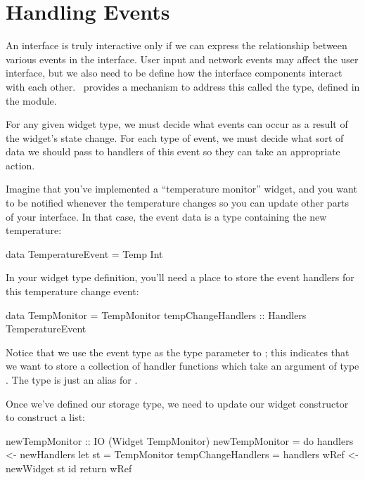 \section{Handling Events}
\label{sec:event_handlers}

An interface is truly interactive only if we can express the
relationship between various events in the interface.  User input and
network events may affect the user interface, but we also need to be
define how the interface components interact with each other.
\vtyui\ provides a mechanism to address this called the 
type, defined in the  module.

For any given widget type, we must decide what events can occur as a
result of the widget's state change.  For each type of event, we must
decide what sort of data we should pass to handlers of this event so
they can take an appropriate action.

Imagine that you've implemented a ``temperature monitor'' widget, and
you want to be notified whenever the temperature changes so you can
update other parts of your interface.  In that case, the event data is
a type containing the new temperature:

\begin{haskellcode}
 data TemperatureEvent = Temp Int
\end{haskellcode}

In your widget type definition, you'll need a place to store the event
handlers for this temperature change event:

\begin{haskellcode}
 data TempMonitor =
   TempMonitor { tempChangeHandlers :: Handlers TemperatureEvent
               }
\end{haskellcode}

Notice that we use the event type as the type parameter to
; this indicates that we want to store a collection of
handler functions which take an argument of type
.  The  type is just an alias for
.

Once we've defined our storage type, we need to update our widget
constructor to construct a  list:

\begin{haskellcode}
 newTempMonitor :: IO (Widget TempMonitor)
 newTempMonitor = do
   handlers <- newHandlers
   let st = TempMonitor { tempChangeHandlers = handlers
                        }
   wRef <- newWidget st id
   return wRef
\end{haskellcode}

